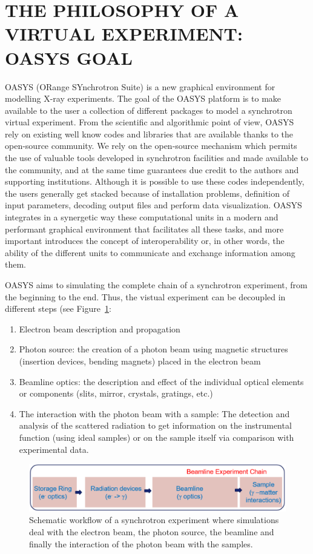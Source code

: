 \documentclass{aip-cp}
\begin{document}
\section{THE PHILOSOPHY OF A VIRTUAL EXPERIMENT: OASYS GOAL}

OASYS (ORange SYnchrotron Suite) is a new graphical environment for modelling X-ray experiments. The goal of the OASYS platform is to make available to the user a collection of different packages to model a synchrotron virtual experiment. From the scientific and algorithmic point of view, OASYS rely on existing well know codes and libraries that are available thanks to the open-source community. We rely on the open-source mechanism which permits the use of valuable tools developed in synchrotron facilities and made available to the community, and at the same time guarantees due credit to the authors and supporting institutions. Although it is possible to use these codes independently, the users generally get stacked because of installation problems, definition of input parameters, decoding output files and perform data visualization. OASYS integrates in a synergetic way these computational units in a modern and performant graphical environment that facilitates all these tasks, and more important introduces the concept of interoperability or, in other words, the ability of the different units to communicate and exchange information among them. 

OASYS aims to simulating the complete chain of a synchrotron experiment, from the beginning to the end. Thus, the vistual experiment can be decoupled in different steps (see Figure~\ref{figChain0}: 
\begin{enumerate}
 \item Electron beam description and propagation
 \item Photon source: the creation of a photon beam using magnetic structures (insertion devices, bending magnets) placed in the electron beam 
 \item Beamline optics: the description and effect of the individual optical elements or components (slits, mirror, crystals, gratings, etc.)
 \item The interaction with the photon beam with a sample: The detection and analysis of the scattered radiation to get information on the instrumental function (using ideal samples) or on the sample itself via comparison with experimental data. 
\end{enumerate}


\begin{figure}[h]
\includegraphics[width=14cm]{FIGURES/chain0.png}
\caption{Schematic workflow of a synchrotron experiment where simulations deal with the electron beam, the photon source, the beamline and finally the interaction of the photon beam with the samples.}
\label{figChain0}
\end{figure}
\end{document}
